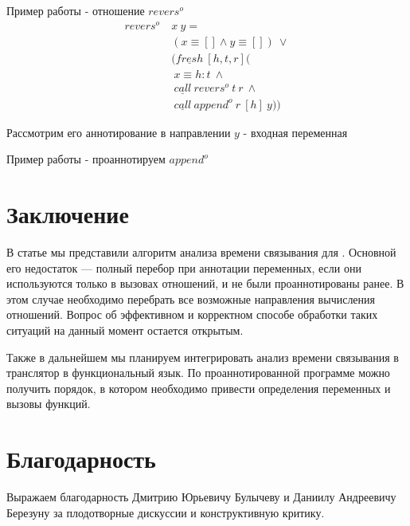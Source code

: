 \documentclass[conference]{IEEEtran}
\begin{document}
Пример работы - отношение $revers^o$
\begin{align*}
revers^o \ &x \ y = \\
           &(x \equiv [] \wedge y \equiv []) \ \vee \\
           &(\underline{fresh} \ [h, t, r] ( \\
           & \ x \equiv h : t \ \wedge \\
           & \ \underline{call} \ revers^o \ t \ r \ \wedge \\ 
           & \ \underline{call} \ append^o \ r \ [h] \ y ))
\end{align*}

Рассмотрим его аннотирование в направлении $y$ - входная переменная

Пример работы - проаннотируем $append^o$

\section{Заключение}\label{conclusion}

В статье мы представили алгоритм анализа времени связывания для \miniKanren{}. Основной его недостаток --- полный перебор при аннотации переменных, если они используются только в вызовах отношений, и не были проаннотированы ранее. В этом случае необходимо перебрать все возможные направления вычисления отношений. Вопрос об эффективном и корректном способе обработки таких ситуаций на данный момент остается открытым.

Также в дальнейшем мы планируем интегрировать анализ времени связывания в транслятор в функциональный язык. По проаннотированной программе можно получить порядок, в котором необходимо привести определения переменных и вызовы функций.

\section*{Благодарность}

Выражаем благодарность Дмитрию Юрьевичу Булычеву и Даниилу Андреевичу Березуну за плодотворные дискуссии и конструктивную критику.



\end{document}

